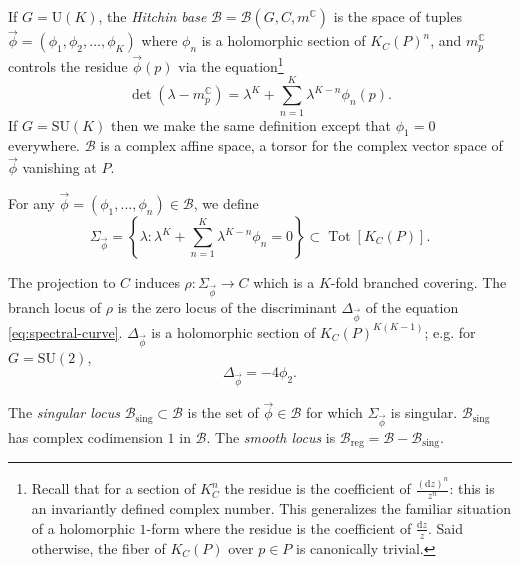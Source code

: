\documentclass[12pt,letterpaper,reqno]{article}
\numberwithin{equation}{section}
\newcommand{\cB}{\ensuremath{\mathcal B}}
\newcommand{\C}{\ensuremath{\mathbb C}}
\newcommand{\de}{\mathrm{d}}
\newcommand{\sing}{\mathrm{sing}}
\newcommand{\reg}{\mathrm{reg}}
\newcommand{\vphi}{{\vec\phi}}
\newcommand{\ti}[1]{\textit{#1}}
\DeclareMathOperator{\Tot}{Tot}
\newcommand{\SU}{\mathrm{SU}}
\newcommand{\U}{\mathrm{U}}
\begin{document}
\begin{defn}
If $G = \U(K)$,
the \ti{Hitchin base} $\cB = \cB(G,C,m^\C)$ is
the space of tuples $\vphi = (\phi_1, \phi_2, \dots, \phi_K)$
where $\phi_n$ is a holomorphic section of $K_C(P)^n$,
and $m_p^\C$ controls the residue $\vphi(p)$ via the equation\footnote{Recall that for a section of $K_C^n$ the residue is the coefficient of $\frac{(\de z)^n}{z^n}$: this is an invariantly
defined complex number. This generalizes the familiar situation of a holomorphic $1$-form
where the residue is the coefficient of $\frac{\de z}{z}$. Said otherwise, the fiber of
$K_C(P)$ over $p \in P$ is canonically trivial.}
\begin{equation}
  \det (\lambda - m_p^\C) = \lambda^K + \sum_{n=1}^K \lambda^{K-n} \phi_n(p).
\end{equation}
If $G = \SU(K)$ then we make the same definition except that
$\phi_1 = 0$ everywhere.
$\cB$ is a complex affine space, a torsor for the complex vector space
of $\vphi$ vanishing at $P$.

\begin{defn}
For any $\vphi = (\phi_1, \dots, \phi_n) \in \cB$,
we define
\begin{equation} \label{eq:spectral-curve}
  \Sigma_{\vphi} = \left\{ \lambda: \lambda^K + \sum_{n=1}^K \lambda^{K-n} \phi_n = 0 \right\} \subset \Tot[K_C(P)].
\end{equation}
\end{defn}
The projection to $C$ induces $\rho: \Sigma_\vphi \to C$ which is a $K$-fold branched covering.
The branch locus of $\rho$ is the zero locus of the discriminant $\Delta_{\vphi}$ of the equation \eqref{eq:spectral-curve}. $\Delta_\vphi$ 
is a holomorphic section of $K_C(P)^{K(K-1)}$;
e.g. for $G = \SU(2)$,
\begin{equation} \label{eq:discriminant-K2}
  \Delta_{\vphi} = - 4 \phi_2.
\end{equation}

\begin{defn}
The \ti{singular locus} $\cB_\sing \subset \cB$ is the set of $\vphi \in \cB$
for which $\Sigma_{\vec \phi}$ is singular. $\cB_\sing$ has complex codimension $1$ in $\cB$.
The \ti{smooth locus} is $\cB_\reg = \cB - \cB_\sing$.
\end{defn}


\end{defn}
\end{document}
